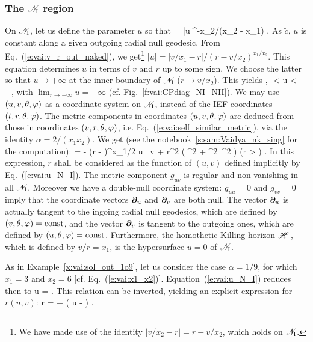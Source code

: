 \subsubsection{The $\mathscr{N}_{\rm I}$ region}

On $\mathscr{N}_{\rm I}$, let us define the parameter $u$ so that
\be \label{e:vai:def_u_tilde_c}
     = |u|^{-x_2/(x_2 - x_1)} .
\ee
As $\tilde{c}$, $u$ is constant along a given outgoing radial null geodesic.
From Eq.~(\ref{e:vai:v_r_out_naked}), we get\footnote{We have made use of
the identity $|v/x_2 - r| = r - v/x_2$, which holds on $ \mathscr{N}_{\rm I}$.}
$|u| = |v/x_1 - r| / (r - v/x_2)^{x_1/x_2}$. This equation determines
$u$ in terms of $v$ and $r$ up to some sign. We choose the latter so that
$u \to +\infty$ at the inner boundary of $\mathscr{N}_{\rm I}$
($r \to v/x_2$). This yields
\be \label{e:vai:u_N_I}
    , \quad -\infty < u < +\infty ,
\ee
with $\lim_{r\to +\infty} u = - \infty$ (cf. Fig.~\ref{f:vai:CPdiag_NI_NII}).
We may use $(u, v, \theta, \varphi)$ as a coordinate system on $\mathscr{N}_{\rm I}$,
instead of the IEF coordinates $(t, r, \theta, \varphi)$.
The metric components in coordinates $(u, v, \theta, \varphi)$
are deduced from those in coordinates $(v, r, \theta, \varphi)$, i.e.
Eq.~(\ref{e:vai:self_similar_metric}), via
the identity $\alpha=2/(x_1 x_2)$. We get
(see the notebook~\ref{s:sam:Vaidya_nk_sing} for the computation):
\be \label{e:vai:metric_N_I}
     = -  \left(r -  \right)^{x_1/2}
        \dd u \, \dd v
        + r^2 \left( \dd\th^2 + \sin^2\th\, \dd\ph^2 \right) \qquad
        \left(r > \right) .
\ee
In this expression, $r$ shall be considered as the function of $(u,v)$ defined
implicitly by Eq.~(\ref{e:vai:u_N_I}).
The metric component $g_{uv}$ is regular and non-vanishing in all $\mathscr{N}_{\rm I}$.
Moreover we have a double-null coordinate system:
$g_{uu} = 0$ and $g_{vv} = 0$ imply that the coordinate vectors $\bm{\partial}_u$
and $\bm{\partial}_v$ are both null. The vector $\bm{\partial}_u$ is actually tangent to the
ingoing radial null geodesics, which are defined by $(v,\theta,\varphi) = \mathrm{const}$,
and the vector $\bm{\partial}_v$ is tangent to the outgoing ones, which are defined
by $(u,\theta,\varphi) = \mathrm{const}$. Furthermore, the homothetic Killing horizon $\mathscr{H}_1$, which is defined by $v/r = x_1$, is the hypersurface
$u = 0$ of $\mathscr{N}_{\rm I}$.


\begin{example} \label{x:vai:u_r_1o9}
As in Example~\ref{x:vai:sol_out_1o9}, let us consider the case $\alpha=1/9$,
for which $x_1 = 3$ and $x_2 = 6$ [cf. Eq.~(\ref{e:vai:x1_x2})]. Equation~(\ref{e:vai:u_N_I})
reduces then to
\be
    u =  .
\ee
This relation can be inverted, yielding an explicit expression for $r(u, v)$:
\be \label{e:vai:r_uv_1o9}
    r =  +  \left( u -  \right) .
\ee
\end{example}

